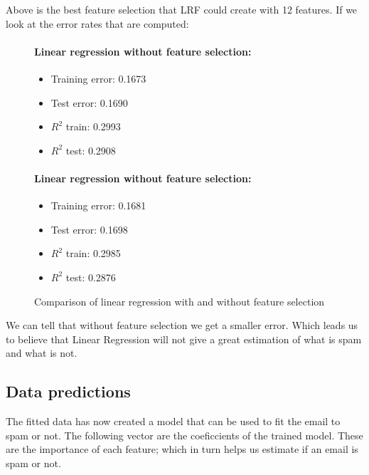 \documentclass[11pt, paper=a4]{article}
\begin{document}
Above is the best feature selection that LRF could create with 12
features.  If we look at the error rates that are
computed:

\begin{figure}[h]
  \begin{minipage}{0.4\textwidth}
    \paragraph{Linear regression without feature selection:}
    \begin{itemize}
    \item Training error: 0.1673
    \item Test error:     0.1690
    \item $R^2$ train:     0.2993
    \item $R^2$ test:     0.2908
    \end{itemize}
  \end{minipage} \hfill
  \begin{minipage}{0.4\textwidth}
    \paragraph{Linear regression without feature selection:}
    \begin{itemize}
    \item Training error: 0.1681
    \item Test error:     0.1698
    \item $R^2$ train:     0.2985
    \item $R^2$ test:     0.2876
    \end{itemize}
  \end{minipage} \vfill
  \caption{Comparison of linear regression with and without feature selection}
\end{figure}
We can tell that without feature selection we get a smaller
error. Which leads us to believe that Linear Regression will not give
a great estimation of what is spam and what is not.

\subsection{Data predictions}
The fitted data has now created a model that can be used to fit the
email to spam or not.  The following vector are the coeficcients of
the trained model. These are the importance of each feature; which in
turn helps us estimate if an email is spam or not.
\end{document}
